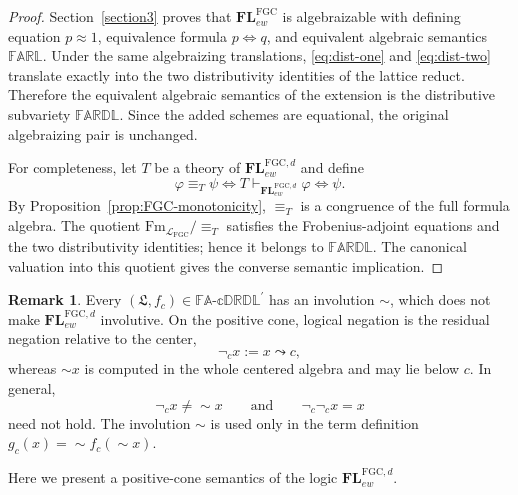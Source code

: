 \documentclass[final,12pt,times]{elsarticle}
\theoremstyle{plain}
\theoremstyle{definition}
\newtheorem{remark}[definition]{Remark}
\theoremstyle{break}
\newcommand{\FARL}{\mathbb{FARL}}
\newcommand{\FARDL}{\mathbb{FARDL}}
\newcommand{\CFADp}{\mathbb{FA\text{-}cDRDL}^{\prime}}
\newcommand{\FLFGC}{\mathbf{FL}^{\mathrm{FGC}}_{ew}}
\begin{document}
\begin{proof}
Section~\ref{section3} proves that \(\FLFGC\) is algebraizable with defining
equation \(p\approx1\), equivalence formula \(p\Leftrightarrow q\), and
equivalent algebraic semantics \(\FARL\).  Under the same algebraizing
translations, \eqref{eq:dist-one} and \eqref{eq:dist-two} translate exactly
into the two distributivity identities of the lattice reduct.  Therefore the
equivalent algebraic semantics of the extension is the distributive
subvariety \(\FARDL\).  Since the added schemes are equational, the original
algebraizing pair is unchanged.

For completeness, let \(T\) be a theory of
\(\mathbf{FL}^{\mathrm{FGC},d}_{ew}\) and define
\[
 \varphi\equiv_T\psi
 \Longleftrightarrow
 T\vdash_{\mathbf{FL}^{\mathrm{FGC},d}_{ew}}
   \varphi\Leftrightarrow\psi.
\]
By Proposition~\ref{prop:FGC-monotonicity}, \(\equiv_T\) is a congruence of
the full formula algebra.  The quotient
\(\mathrm{Fm}_{\mathcal L_{\mathrm{FGC}}}/\!\equiv_T\) satisfies the
Frobenius-adjoint equations and the two distributivity identities; hence it
belongs to \(\FARDL\).  The canonical valuation into this quotient gives the
converse semantic implication.
\end{proof}


\begin{remark}
\label{rem:ambient-involution}
Every \((\boldsymbol{\mathfrak L},f_c)\in\CFADp\) has an involution
\({\sim}\), which does not make
\(\mathbf{FL}^{\mathrm{FGC},d}_{ew}\) involutive.  On the positive cone,
logical negation is the residual negation relative to the center,
\[
 \neg_c x:=x\leadsto c,
\]
whereas \({\sim}x\) is computed in the whole centered algebra and may lie
below \(c\).  In general,
\[
 \neg_c x\neq{\sim}x
 \qquad\text{and}\qquad
 \neg_c\neg_c x=x
\]
need not hold.  The involution \({\sim}\) is used only in the term definition
\(g_c(x)={\sim}f_c({\sim}x)\).
\end{remark}

Here we present a positive-cone semantics of the logic \(\mathbf{FL}^{\mathrm{FGC},d}_{ew}\).
\end{document}
